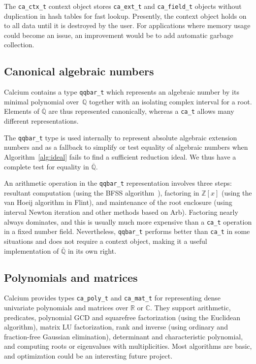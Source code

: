 \documentclass[sigconf,screen,urlbreakonhyphens]{acmart}
\begin{document}
The \texttt{ca\_ctx\_t} context object stores
\texttt{ca\_ext\_t} and \texttt{ca\_field\_t} objects
without duplication
in hash tables for fast lookup.
Presently, the context object holds on to all data
until it is destroyed by the user. For applications where memory usage could become
an issue, an improvement would be to add
automatic garbage collection.

\subsection{Canonical algebraic numbers}

Calcium contains
a type \texttt{qqbar\_t} which represents an algebraic number by its 
minimal polynomial over~$\mathbb{Q}$ together with an
isolating complex interval for a root.
Elements of $\overline{\mathbb{Q}}$ are thus represented canonically,
whereas a \texttt{ca\_t} allows many different representations.

The \texttt{qqbar\_t} type is used internally to represent
absolute algebraic extension numbers
and as a fallback
to simplify or test equality of algebraic numbers when Algorithm~\ref{alg:ideal}
fails to find a sufficient reduction ideal.
We thus have a complete test for equality in $\overline{\mathbb{Q}}$.

An arithmetic operation in the \texttt{qqbar\_t} representation involves three steps:
resultant computation (using the BFSS algorithm~\cite{Bos2006}), factoring in $\mathbb{Z}[x]$ (using the van Hoeij algorithm in Flint),
and maintenance of the root enclosure (using interval Newton iteration and other methods based on Arb).
Factoring
nearly always dominates, and this is usually much more expensive
than a \texttt{ca\_t} operation in a fixed number field.
Nevertheless, \texttt{qqbar\_t} performs better than \texttt{ca\_t}
in some situations
and does not require a context object, making it a useful implementation of $\overline{\mathbb{Q}}$
in its own right.

\subsection{Polynomials and matrices}

Calcium provides types \texttt{ca\_poly\_t} and \texttt{ca\_mat\_t}
for representing dense univariate polynomials and matrices over $\mathbb{R}$
or $\mathbb{C}$.
They support arithmetic, predicates,
polynomial GCD and squarefree factorization (using the Euclidean algorithm),
matrix LU factorization, rank and inverse (using ordinary and fraction-free Gaussian elimination),
determinant and characteristic polynomial,
and computing roots or eigenvalues with
multiplicities. Most algorithms are basic,
and optimization could be an interesting future project.
\end{document}
